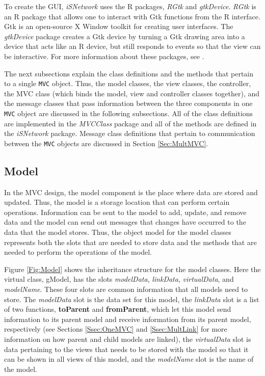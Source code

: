 \documentclass{article}[11pt]
\newcommand{\Rfunction}[1]{{\textbf{#1}}}
\newcommand{\Robject}[1]{{\texttt{#1}}}
\newcommand{\Rpackage}[1]{{\textit{#1}}}
\newcommand{\Rslot}[1]{\textsl{#1}}
\newcommand{\Rclass}[1]{\textsf{#1}}
\begin{document}
To create the GUI, \Rpackage{iSNetwork} uses the R packages,
\Rpackage{RGtk} and \Rpackage{gtkDevice}.  \Rpackage{RGtk} is an R package
that allows one to interact with Gtk functions from the R interface.  Gtk is
an open-source X Window toolkit \cite{Gtk} for creating user interfaces.  The
\Rpackage{gtkDevice} package creates a Gtk device by turning a Gtk drawing
area into a device that acts like an R device, but still responds to events so
that the view can be interactive.  For more information about these packages,
see \cite{EW05}.  

The next subsections explain the class definitions and the methods that
pertain to a single \Robject{MVC} object.  Thus, the model classes,
the view classes, the controller, the \Rclass{MVC} class
(which binds the model, view and controller classes
together), and the message classes that pass information between the
three components in one \Robject{MVC} object are discussed in the following
subsections.  All of the class definitions are implemented in the
\Rpackage{MVCClass} package and all of the methods are defined in the
\Rpackage{iSNetwork} package.  Message class definitions that pertain
to communication between the \Robject{MVC} objects are discussed in Section
\ref{Sec:MultMVC}. 

\subsection{Model}\label{Ssec:OneModel}

In the MVC design, the model component is the place where data are stored and
updated.  Thus, the model is a storage location that can perform certain
operations.  Information can be sent to the model to add, update, and remove
data and the model can send out messages that changes have occurred to the
data that the model stores.  Thus, the object model for the model
classes represents both the slots that are needed to store data and the
methods that are needed to perform the operations of the model. 

Figure \ref{Fig:Model} shows the inheritance structure for the model
classes. Here the virtual class, \Rclass{gModel}, has the slots
\Rslot{modelData}, \Rslot{linkData}, \Rslot{virtualData}, and
\Rslot{modelName}.  These four slots are common information that all models
need to store.  The \Rslot{modelData} slot is the data set for this model, the
\Rslot{linkData} slot is a list of two functions, \Rfunction{toParent} and
\Rfunction{fromParent}, which let this model send information to its parent
model and receive information from its parent model, respectively (see
Sections \ref{Ssec:OneMVC} and \ref{Ssec:MultLink} for more information on how
parent and child models are linked), the \Rslot{virtualData} slot is data
pertaining to the views that needs to be stored with the model so that it can
be shown in all views of this model, and the \Rslot{modelName} slot is the
name of the model. 
\end{document}
